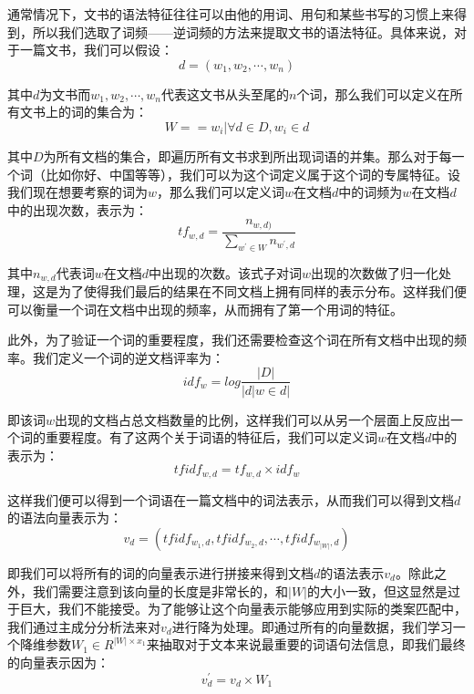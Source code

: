 通常情况下，文书的语法特征往往可以由他的用词、用句和某些书写的习惯上来得到，所以我们选取了词频——逆词频的方法来提取文书的语法特征。具体来说，对于一篇文书，我们可以假设：
	\begin{equation}
		d = (w_1,w_2,⋯,w_n)
	\end{equation}
	
其中$d$为文书而$w_1,w_2,⋯,w_n$代表这文书从头至尾的$n$个词，那么我们可以定义在所有文书上的词的集合为：
	\begin{equation}
		W = ={w_i |\forall d∈D,w_i∈d}
	\end{equation}
	
其中$D$为所有文档的集合，即遍历所有文书求到所出现词语的并集。那么对于每一个词（比如你好、中国等等），我们可以为这个词定义属于这个词的专属特征。设我们现在想要考察的词为$w$，那么我们可以定义词$w$在文档$d$中的词频为$w$在文档$d$中的出现次数，表示为：
	\begin{equation}
		tf_{w,d} = \frac{n_{w,d)}}{\sum_{w^{'} \in W}n_{w^{'},d}}
	\end{equation}

其中$n_{w,d}$代表词$w$在文档$d$中出现的次数。该式子对词$w$出现的次数做了归一化处理，这是为了使得我们最后的结果在不同文档上拥有同样的表示分布。这样我们便可以衡量一个词在文档中出现的频率，从而拥有了第一个用词的特征。

此外，为了验证一个词的重要程度，我们还需要检查这个词在所有文档中出现的频率。我们定义一个词的逆文档评率为：
	\begin{equation}
		idf_{w}=log⁡ \frac{|D|}{|{d|w \in d}|}
	\end{equation}
	
即该词$w$出现的文档占总文档数量的比例，这样我们可以从另一个层面上反应出一个词的重要程度。有了这两个关于词语的特征后，我们可以定义词$w$在文档$d$中的表示为：
	\begin{equation}
		tfidf_{w,d} = tf_{w,d} \times idf_{w}
	\end{equation}
	
这样我们便可以得到一个词语在一篇文档中的词法表示，从而我们可以得到文档$d$的语法向量表示为：
	\begin{equation}
		v_{d}=(tfidf_{w_{1},d},tfidf_{w_{2},d},⋯,tfidf_{w_{|W|},d})
	\end{equation}
	
即我们可以将所有的词的向量表示进行拼接来得到文档$d$的语法表示$v_{d}$。除此之外，我们需要注意到该向量的长度是非常长的，和$|W|$的大小一致，但这显然是过于巨大，我们不能接受。为了能够让这个向量表示能够应用到实际的类案匹配中，我们通过主成分分析法来对$v_{d}$进行降为处理。即通过所有的向量数据，我们学习一个降维参数$W_{1} \in R^{|W| \times x_{1}}$来抽取对于文本来说最重要的词语句法信息，即我们最终的向量表示因为：
	\begin{equation}
		v_{d}^{'}=v_{d} \times W_{1}
	\end{equation}


